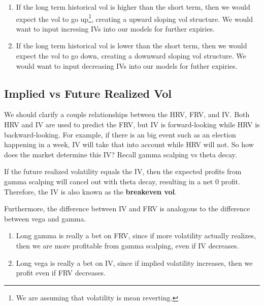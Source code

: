 \documentclass{article}
\begin{document}
    \begin{definition}
      \begin{enumerate}
        \item If the long term historical vol is higher than the short term, then we would expect the vol to go up\footnote{We are assuming that volatility is mean reverting. }, creating a upward sloping vol structure. We would want to input incresing IVs into our models for further expiries.
        \item If the long term historical vol is lower than the short term, then we would expect the vol to go down, creating a downward sloping vol structure. We would want to input decreasing IVs into our models for futher expiries.
      \end{enumerate}
    \end{definition}

  \subsection{Implied vs Future Realized Vol}

    We should clarify a couple relationships between the HRV, FRV, and IV. Both HRV and IV are used to predict the FRV, but IV is forward-looking while HRV is backward-looking. For example, if there is an big event such as an election happening in a week, IV will take that into account while HRV will not. So how does the market determine this IV? Recall gamma scalping vs theta decay. 

    \begin{theorem}
      If the future realized volatility equals the IV, then the expected profits from gamma scalping will cancel out with theta decay, resulting in a net $0$ profit. Therefore, the IV is also known as the \textbf{breakeven vol}. 
    \end{theorem}

    Furthermore, the difference between IV and FRV is analogous to the difference between vega and gamma. 
    \begin{enumerate}
      \item Long gamma is really a bet on FRV, since if more volatility actually realizes, then we are more profitable from gamma scalping, even if IV decreases. 
      \item Long vega is really a bet on IV, since if implied volatility increases, then we profit even if FRV decreases. 
    \end{enumerate}
\end{document}
